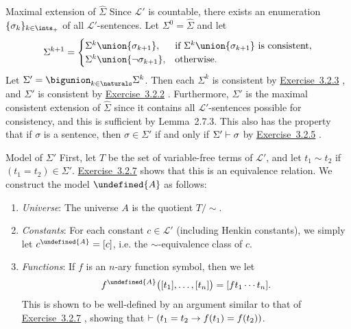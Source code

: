 \documentclass[article, a4paper, 11pt, oneside]{memoir}
\let\mathfrak\undefined
\numberwithin{equation}{chapter}
\newcommand{\calL}{\mathcal{L}}
\newcommand{\frakA}{\mathfrak{A}}
\newcommand{\RNum}[1]{\uppercase\expandafter{\romannumeral #1\relax}}
\newcommand{\exref}[1]{%
    \hyperref[ex:#1]{Exercise~#1}%
}
\theoremstyle{nonumberplain}
\newcommand{\posints}{\ints_+}
\begin{document}
\begin{notelist}
    \item[Maximal extension of $\hat\Sigma$]
    Since $\calL'$ is countable, there exists an enumeration $\{\sigma_k\}_{k \in \posints}$ of all $\calL'$-sentences. Let $\Sigma^0 = \hat\Sigma$ and let
    \begin{equation*}
        \Sigma^{k+1} =
        \begin{cases}
            \Sigma^k \union \{ \sigma_{k+1} \},
                & \text{if $\Sigma^k \union \{ \sigma_{k+1} \}$ is consistent}, \\
                \Sigma^k \union \{ \neg\sigma_{k+1} \},
                & \text{otherwise}.
        \end{cases}
    \end{equation*}
    Let $\Sigma' = \bigunion_{k\in\naturals} \Sigma^k$. Then each $\Sigma^k$ is consistent by \exref{3.2.3}, and $\Sigma'$ is consistent by \exref{3.2.2}. Furthermore, $\Sigma'$ is the maximal consistent extension of $\hat\Sigma$ since it contains all $\calL'$-sentences possible for consistency, and this is sufficient by Lemma~2.7.3. This also has the property that if $\sigma$ is a sentence, then $\sigma \in \Sigma'$ if and only if $\Sigma' \vdash \sigma$ by \exref{3.2.5}.

    \item[Model of $\Sigma'$]
    First, let $T$ be the set of variable-free terms of $\calL'$, and let $t_1 \sim t_2$ if $(t_1 = t_2) \in \Sigma'$. \exref{3.2.7} shows that this is an equivalence relation. We construct the model $\frakA$ as follows:
    \begin{enumerate}
        \item \emph{Universe}: The universe $A$ is the quotient $T/{\sim}$.

        \item \emph{Constants}: For each constant $c \in \calL'$ (including Henkin constants), we simply let $c^\frakA = [c]$, i.e. the $\sim$-equivalence class of $c$.

        \item \emph{Functions}: If $f$ is an $n$-ary function symbol, then we let
        \begin{equation*}
            f^\frakA \bigl( [t_1], \ldots, [t_n] \bigr)
                = [f t_1 \cdots t_n].
        \end{equation*}
        This is shown to be well-defined by an argument similar to that of \exref{3.2.7}, showing that $\vdash (t_1 = t_2 \rightarrow f(t_1) = f(t_2))$.


\end{enumerate}
\end{notelist}
\end{document}
